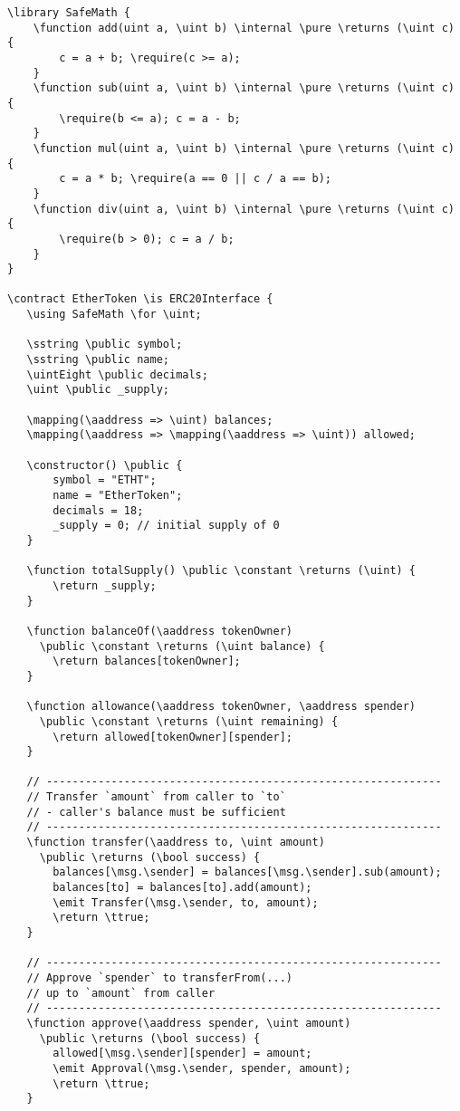 \documentclass{llncs}
\newcommand{\red}[1]{\textcolor[rgb]{1,0,0}{#1}}
\newcommand{\blue}[1]{\textcolor[rgb]{0,0,1}{#1}}
\newcommand{\brown}[1]{\textcolor[rgb]{0.8,0.6,0.4}{#1}}
\newcommand{\green}[1]{\textcolor[rgb]{0.1,0.7,0.1}{#1}}
\newcommand{\verbsize}{\small}
\newcommand{\contract}{\red{contract}}
\newcommand{\library}{\red{library}}
\newcommand{\function}{\blue{function}}
\newcommand{\returns}{\blue{returns}}
\newcommand{\public}{\blue{public}}
\newcommand{\constant}{\blue{constant}}
\newcommand{\internal}{\blue{internal}}
\newcommand{\pure}{\blue{pure}}
\newcommand{\require}{\blue{require}}
\newcommand{\return}{\blue{return}}
\newcommand{\constructor}{\blue{consructor}}
\newcommand{\is}{\blue{is}}
\newcommand{\using}{\blue{using}}
\newcommand{\for}{\blue{for}}
\newcommand{\emit}{\blue{emit}}
\newcommand{\ttrue}{\green{true}}
\newcommand{\msg}{\green{msg}}
\newcommand{\sender}{\green{sender}}
\newcommand{\sstring}{\brown{string}}
\newcommand{\uintEight}{\brown{uint8}}
\newcommand{\uint}{\brown{uint}}
\newcommand{\bool}{\brown{bool}}
\newcommand{\aaddress}{\brown{address}}
\newcommand{\mapping}{\brown{mapping}}
\begin{document}
\begin{small}
\begin{Verbatim}[commandchars=\\\?\?,fontsize=\verbsize]
\library SafeMath {
    \function add(uint a, \uint b) \internal \pure \returns (\uint c) {
        c = a + b; \require(c >= a);
    }
    \function sub(uint a, \uint b) \internal \pure \returns (\uint c) {
        \require(b <= a); c = a - b;
    }
    \function mul(uint a, \uint b) \internal \pure \returns (\uint c) {
        c = a * b; \require(a == 0 || c / a == b);
    }
    \function div(uint a, \uint b) \internal \pure \returns (\uint c) {
        \require(b > 0); c = a / b;
    }
}

\contract EtherToken \is ERC20Interface {
   \using SafeMath \for \uint;
 
   \sstring \public symbol;
   \sstring \public name;
   \uintEight \public decimals;
   \uint \public _supply;
 
   \mapping(\aaddress => \uint) balances;
   \mapping(\aaddress => \mapping(\aaddress => \uint)) allowed;
 
   \constructor() \public {
       symbol = "ETHT";
       name = "EtherToken";
       decimals = 18;
       _supply = 0; // initial supply of 0
   }
 
   \function totalSupply() \public \constant \returns (\uint) {
       \return _supply;
   }
 
   \function balanceOf(\aaddress tokenOwner) 
     \public \constant \returns (\uint balance) {
       \return balances[tokenOwner];
   }

   \function allowance(\aaddress tokenOwner, \aaddress spender) 
     \public \constant \returns (\uint remaining) {
       \return allowed[tokenOwner][spender];
   } 
 
   // -------------------------------------------------------------
   // Transfer `amount` from caller to `to`
   // - caller's balance must be sufficient
   // -------------------------------------------------------------
   \function transfer(\aaddress to, \uint amount) 
     \public \returns (\bool success) {
       balances[\msg.\sender] = balances[\msg.\sender].sub(amount);
       balances[to] = balances[to].add(amount);
       \emit Transfer(\msg.\sender, to, amount);
       \return \ttrue;
   }
 
   // -------------------------------------------------------------
   // Approve `spender` to transferFrom(...) 
   // up to `amount` from caller
   // -------------------------------------------------------------
   \function approve(\aaddress spender, \uint amount) 
     \public \returns (\bool success) {
       allowed[\msg.\sender][spender] = amount;
       \emit Approval(\msg.\sender, spender, amount);
       \return \ttrue;
   }
 

\end{Verbatim}
\end{small}
\end{document}
